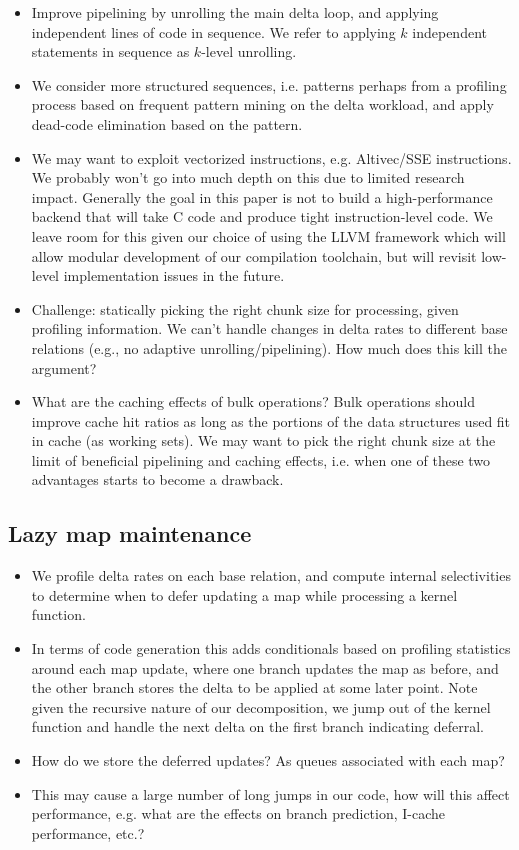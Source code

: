 \begin{itemize}
  \item Improve pipelining by unrolling the main delta loop, and
  applying independent lines of code in sequence. We refer to applying
  $k$ independent statements in sequence as $k$-level unrolling.
  \item We consider more structured sequences, i.e. patterns perhaps from
  a profiling process based on frequent pattern mining on the delta workload,
  and apply dead-code elimination based on the pattern.
  \item We may want to exploit vectorized instructions, e.g. Altivec/SSE
  instructions. We probably won't go into much depth on this due to limited
  research impact. Generally the goal in this paper is not to build a
  high-performance backend that will take C code and produce tight
  instruction-level code. We leave room for this given our choice of using
  the LLVM framework which will allow modular development of our compilation
  toolchain, but will revisit low-level implementation issues in the future.
  \item Challenge: statically picking the right chunk size for processing, given
  profiling information. We can't handle changes in delta rates to different base
  relations (e.g., no adaptive unrolling/pipelining). How much does this kill the
  argument?
  \item What are the caching effects of bulk operations? Bulk operations should
  improve cache hit ratios as long as the portions of the data structures used
  fit in cache (as working sets). We may want to pick the right chunk size at the
  limit of beneficial pipelining and caching effects, i.e. when one of these two
  advantages starts to become a drawback.
\end{itemize}

\subsection{Lazy map maintenance}

\begin{itemize}
  \item We profile delta rates on each base relation, and compute internal
  selectivities to determine when to defer updating a map while processing a
  kernel function.
  \item In terms of code generation this adds conditionals based on profiling
  statistics around each map update, where one branch updates the map as before,
  and the other branch stores the delta to be applied at some later point. Note
  given the recursive nature of our decomposition, we jump out of the kernel
  function and handle the next delta on the first branch indicating deferral.
  \item How do we store the deferred updates? As queues associated with each
  map?
  \item This may cause a large number of long jumps in our code, how will this
  affect performance, e.g. what are the effects on branch prediction, I-cache
  performance, etc.?
\end{itemize}

